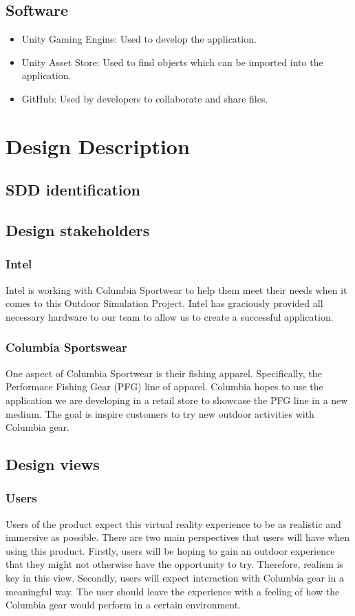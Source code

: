 \documentclass[10pt,journal,compsoc,onecolumn, draftclsnofoot]{IEEEtran}
\begin{document}
\subsection{Software}
\begin{itemize}
  \item Unity Gaming Engine: Used to develop the application.
  \item Unity Asset Store: Used to find objects which can be imported into the application.
  \item GitHub: Used by developers to collaborate and share files.
\end{itemize}


\section{Design Description}
\subsection{SDD identification}
\subsection{Design stakeholders}
\subsubsection{Intel}
Intel is working with Columbia Sportwear to help them meet their needs when it comes to this Outdoor Simulation Project.
Intel has graciously provided all necessary hardware to our team to allow us to create a successful application.

\subsubsection{Columbia Sportswear}
One aspect of Columbia Sportwear is their fishing apparel.
Specifically, the Performace Fishing Gear (PFG) line of apparel.
Columbia hopes to use the application we are developing in a retail store to showcase the PFG line in a new medium.
The goal is inspire customers to try new outdoor activities with Columbia gear.

\subsection{Design views}
\subsubsection{Users}
Users of the product expect this virtual reality experience to be as realistic and immersive as possible.
There are two main perspectives that users will have when using this product.
Firstly, users will be hoping to gain an outdoor experience that they might not otherwise have the opportunity to try.
Therefore, realism is key in this view.
Secondly, users will expect interaction with Columbia gear in a meaningful way.
The user should leave the experience with a feeling of how the Columbia gear would perform in a certain environment.
\end{document}
